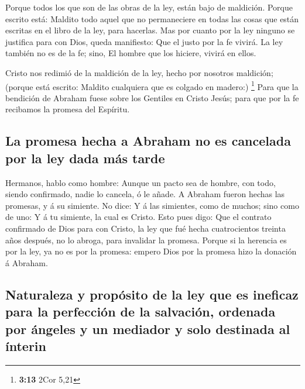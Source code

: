  Porque todos los que son de las obras de la ley, están
bajo de maldición. Porque escrito está: Maldito todo aquel que no
permaneciere en todas las cosas que están escritas en el libro de la
ley, para hacerlas.  Mas por cuanto por la ley ninguno se
justifica para con Dios, queda manifiesto: Que el justo por la fe
vivirá.  La ley también no es de la fe; sino, El hombre
que los hiciere, vivirá en ellos.

 Cristo nos redimió de la maldición de la ley, hecho por
nosotros maldición; (porque está escrito: Maldito cualquiera que es
colgado en madero:) \footnote{\textbf{3:13} 2Cor 5,21} 
Para que la bendición de Abraham fuese sobre los Gentiles en Cristo
Jesús; para que por la fe recibamos la promesa del Espíritu.

\hypertarget{la-promesa-hecha-a-abraham-no-es-cancelada-por-la-ley-dada-muxe1s-tarde}{%
\subsection{La promesa hecha a Abraham no es cancelada por la ley dada
más
tarde}\label{la-promesa-hecha-a-abraham-no-es-cancelada-por-la-ley-dada-muxe1s-tarde}}

 Hermanos, hablo como hombre: Aunque un pacto sea de
hombre, con todo, siendo confirmado, nadie lo cancela, ó le añade.
 A Abraham fueron hechas las promesas, y á su simiente.
No dice: Y á las simientes, como de muchos; sino como de uno: Y á tu
simiente, la cual es Cristo.  Esto pues digo: Que el
contrato confirmado de Dios para con Cristo, la ley que fué hecha
cuatrocientos treinta años después, no lo abroga, para invalidar la
promesa.  Porque si la herencia es por la ley, ya no es
por la promesa: empero Dios por la promesa hizo la donación á Abraham.

\hypertarget{naturaleza-y-propuxf3sito-de-la-ley-que-es-ineficaz-para-la-perfecciuxf3n-de-la-salvaciuxf3n-ordenada-por-uxe1ngeles-y-un-mediador-y-solo-destinada-al-uxednterin}{%
\subsection{Naturaleza y propósito de la ley que es ineficaz para la
perfección de la salvación, ordenada por ángeles y un mediador y solo
destinada al
ínterin}\label{naturaleza-y-propuxf3sito-de-la-ley-que-es-ineficaz-para-la-perfecciuxf3n-de-la-salvaciuxf3n-ordenada-por-uxe1ngeles-y-un-mediador-y-solo-destinada-al-uxednterin}}

